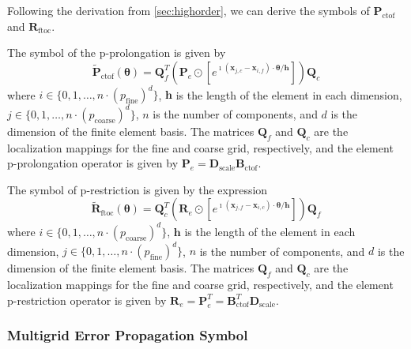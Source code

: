 \documentclass[review]{siamart190516}
\begin{document}
Following the derivation from \cref{sec:highorder}, we can derive the symbols of $\mathbf{P}_{\text{ctof}}$ and $\mathbf{R}_{\text{ftoc}}$.

\begin{definition}
The symbol of the p-prolongation is given by
\begin{equation}
\tilde{\mathbf{P}}_{\text{ctof}} \left( \boldsymbol{\theta} \right) = \mathbf{Q}_f^T \left( \mathbf{P}_e \odot \left[ e^{\imath \left( \mathbf{x}_{j, c} - \mathbf{x}_{i, f} \right) \cdot \boldsymbol{\theta} / \mathbf{h}} \right] \right) \mathbf{Q}_c
\end{equation}
where $i \in \lbrace 0, 1, \dots, n \cdot \left( p_{\text{fine}} \right)^d \rbrace$, $\mathbf{h}$ is the length of the element in each dimension, $j \in \lbrace 0, 1, \dots, n \cdot \left( p_{\text{coarse}} \right)^d \rbrace$, $n$ is the number of components, and $d$ is the dimension of the finite element basis.
The matrices $\mathbf{Q}_f$ and $\mathbf{Q}_c$ are the localization mappings for the fine and coarse grid, respectively, and the element p-prolongation operator is given by $\mathbf{P}_e = \mathbf{D}_{\text{scale}} \mathbf{B}_{\text{ctof}}$.
\end{definition}\label{def:prolongation_symbol}

\begin{definition}
The symbol of p-restriction is given by the expression
\begin{equation}
\tilde{\mathbf{R}}_{\text{ftoc}} \left( \boldsymbol{\theta} \right) = \mathbf{Q}_c^T \left( \mathbf{R}_e \odot \left[ e^{\imath \left( \mathbf{x}_{j, f} - \mathbf{x}_{i, c} \right) \cdot \boldsymbol{\theta} / \mathbf{h}} \right] \right) \mathbf{Q}_f
\end{equation}
where $i \in \lbrace 0, 1, \dots, n \cdot \left( p_{\text{coarse}} \right)^d \rbrace$, $\mathbf{h}$ is the length of the element in each dimension, $j \in \lbrace 0, 1, \dots, n \cdot \left( p_{\text{fine}} \right)^d \rbrace$, $n$ is the number of components, and $d$ is the dimension of the finite element basis.
The matrices $\mathbf{Q}_f$ and $\mathbf{Q}_c$ are the localization mappings for the fine and coarse grid, respectively, and the element p-restriction operator is given by $\mathbf{R}_e = \mathbf{P}_e^T = \mathbf{B}_{\text{ctof}}^T \mathbf{D}_{\text{scale}}$.
\end{definition}\label{def:restriction_symbol}

\subsubsection{Multigrid Error Propagation Symbol}\label{sec:multigridsymbol}
\end{document}
